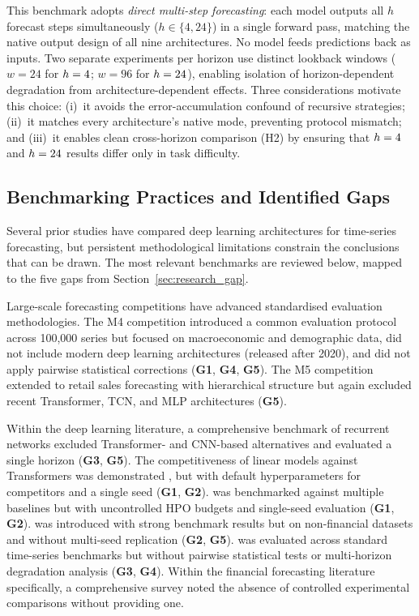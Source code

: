 This benchmark adopts \emph{direct multi-step forecasting}: each model outputs all $h$ forecast steps simultaneously ($h \in \{4, 24\}$) in a single forward pass, matching the native output design of all nine architectures.  No model feeds predictions back as inputs.  Two separate experiments per horizon use distinct lookback windows ($w = 24$ for $h=4$; $w = 96$ for $h=24$), enabling isolation of horizon-dependent degradation from architecture-dependent effects.  Three considerations motivate this choice: (i)~it avoids the error-accumulation confound of recursive strategies; (ii)~it matches every architecture's native mode, preventing protocol mismatch; and (iii)~it enables clean cross-horizon comparison (H2) by ensuring that $h=4$ and $h=24$ results differ only in task difficulty.

\subsection{Benchmarking Practices and Identified Gaps}
\label{sec:benchmarking_gap}

Several prior studies have compared deep learning architectures for time-series forecasting, but persistent methodological limitations constrain the conclusions that can be drawn.  The most relevant benchmarks are reviewed below, mapped to the five gaps from Section~\ref{sec:research_gap}.

Large-scale forecasting competitions have advanced standardised evaluation methodologies.  The M4 competition \citep{Makridakis2018} introduced a common evaluation protocol across 100{,}000 series but focused on macroeconomic and demographic data, did not include modern deep learning architectures (released after 2020), and did not apply pairwise statistical corrections (\textbf{G1}, \textbf{G4}, \textbf{G5}).  The M5 competition \citep{Makridakis2022} extended to retail sales forecasting with hierarchical structure but again excluded recent Transformer, TCN, and MLP architectures (\textbf{G5}).

Within the deep learning literature, a comprehensive benchmark of recurrent networks \citep{Hewamalage2021} excluded Transformer- and CNN-based alternatives and evaluated a single horizon (\textbf{G3}, \textbf{G5}).  The competitiveness of linear models against Transformers was demonstrated \citep{Zeng2023}, but with default hyperparameters for competitors and a single seed (\textbf{G1}, \textbf{G2}).  \timesnet was benchmarked against multiple baselines \citep{Wu2023timesnet} but with uncontrolled HPO budgets and single-seed evaluation (\textbf{G1}, \textbf{G2}).  \patchtst was introduced with strong benchmark results \citep{Nie2023} but on non-financial datasets and without multi-seed replication (\textbf{G2}, \textbf{G5}).  \itransformer was evaluated across standard time-series benchmarks \citep{Liu2024itransformer} but without pairwise statistical tests or multi-horizon degradation analysis (\textbf{G3}, \textbf{G4}).  Within the financial forecasting literature specifically, a comprehensive survey \citep{Sezer2020} noted the absence of controlled experimental comparisons without providing one.

